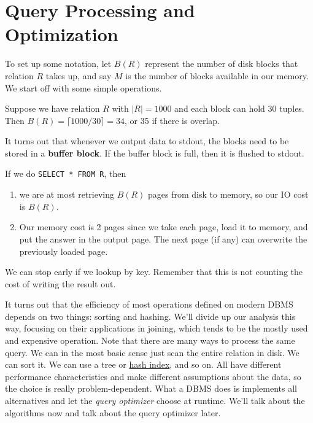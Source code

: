 \section{Query Processing and Optimization}

  \begin{definition}
    \label{def:disk-memory-blocks}
    To set up some notation, let $B(R)$ represent the number of disk blocks that relation $R$ takes up, and say $M$ is the number of blocks available in our memory. We start off with some simple operations. 
  \end{definition}

  \begin{example}
    \label{ex:basic-block-storage}
    Suppose we have relation $R$ with $|R| = 1000$ and each block can hold 30 tuples. Then $B(R) = \lceil 1000 / 30 \rceil = 34$, or 35 if there is overlap. 
  \end{example}

  \begin{definition}
    \label{def:buffer-blocks}
    It turns out that whenever we output data to stdout, the blocks need to be stored in a \textbf{buffer block}. If the buffer block is full, then it is flushed to stdout. 
  \end{definition}

  \begin{example}
    \label{ex:cost-of-querying-everything}
    If we do \texttt{SELECT * FROM R}, then 
    \begin{enumerate}
      \item we are at most retrieving $B(R)$ pages from disk to memory, so our IO cost is $B(R)$. 
      \item Our memory cost is 2 pages since we take each page, load it to memory, and put the answer in the output page. The next page (if any) can overwrite the previously loaded page. 
    \end{enumerate}
    We can stop early if we lookup by key. Remember that this is not counting the cost of writing the result out. 
  \end{example}

  It turns out that the efficiency of most operations defined on modern DBMS depends on two things: sorting and hashing. We'll divide up our analysis this way, focusing on their applications in joining, which tends to be the mostly used and expensive operation. Note that there are many ways to process the same query. We can in the most basic sense just scan the entire relation in disk. We can sort it. We can use a tree or \hyperref[def:hash-index]{hash index}, and so on. All have different performance characteristics and make different assumptions about the data, so the choice is really problem-dependent. What a DBMS does is implements all alternatives and let the \textit{query optimizer} choose at runtime. We'll talk about the algorithms now and talk about the query optimizer later. 

